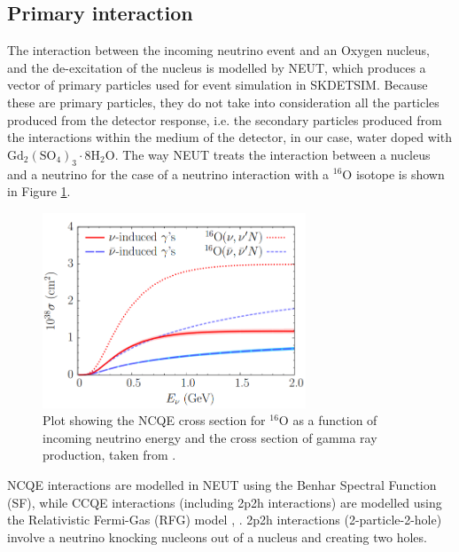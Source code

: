 \subsection{Primary interaction}

The interaction between the incoming neutrino event and an Oxygen nucleus, and the de-excitation of the nucleus is modelled by NEUT, which produces a vector of primary particles used for event simulation in SKDETSIM. Because these are primary particles, they do not take into consideration all the particles produced from the detector response, i.e. the secondary particles produced from the interactions within the medium of the detector, in our case, water doped with $\mathrm{Gd}_{2}\left(\mathrm{SO}_{4}\right)_{3} \cdot 8 \mathrm{H}_{2} \mathrm{O}$. The way NEUT treats the interaction between a nucleus and a neutrino for the case of a neutrino interaction with a ${ }^{16} \mathrm{O}$ isotope is shown in Figure \ref{fig:neutrinonuc}. 

\begin{figure}
    \centering
    \includegraphics[width=0.7\textwidth]{Figures/neutrinonuc.png}
    \caption{Plot showing the NCQE cross section for ${ }^{16} \mathrm{O}$ as a function of incoming neutrino energy and the cross section of gamma ray production, taken from \cite{neutrino_nuc}.}
\label{fig:neutrinonuc}
\end{figure}
 

 NCQE interactions are modelled in NEUT using the Benhar Spectral Function (SF), while CCQE interactions (including 2p2h interactions) are modelled using the Relativistic Fermi-Gas (RFG) model \cite{benhar_electron-_2005}, \cite{rfg_model}. 2p2h interactions (2-particle-2-hole) involve a neutrino knocking nucleons out of a nucleus and creating two holes.


